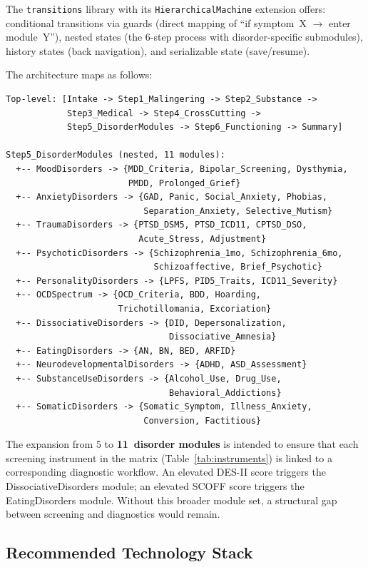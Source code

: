 \documentclass[11pt,a4paper]{article}
\begin{document}
The \texttt{transitions} library with its \texttt{HierarchicalMachine} extension offers: conditional transitions via guards (direct mapping of ``if symptom~X $\to$ enter module~Y''), nested states (the 6-step process with disorder-specific submodules), history states (back navigation), and serializable state (save/resume).

The architecture maps as follows:

\begin{verbatim}
Top-level: [Intake -> Step1_Malingering -> Step2_Substance ->
            Step3_Medical -> Step4_CrossCutting ->
            Step5_DisorderModules -> Step6_Functioning -> Summary]

Step5_DisorderModules (nested, 11 modules):
  +-- MoodDisorders -> {MDD_Criteria, Bipolar_Screening, Dysthymia,
                        PMDD, Prolonged_Grief}
  +-- AnxietyDisorders -> {GAD, Panic, Social_Anxiety, Phobias,
                           Separation_Anxiety, Selective_Mutism}
  +-- TraumaDisorders -> {PTSD_DSM5, PTSD_ICD11, CPTSD_DSO,
                          Acute_Stress, Adjustment}
  +-- PsychoticDisorders -> {Schizophrenia_1mo, Schizophrenia_6mo,
                             Schizoaffective, Brief_Psychotic}
  +-- PersonalityDisorders -> {LPFS, PID5_Traits, ICD11_Severity}
  +-- OCDSpectrum -> {OCD_Criteria, BDD, Hoarding,
                      Trichotillomania, Excoriation}
  +-- DissociativeDisorders -> {DID, Depersonalization,
                                Dissociative_Amnesia}
  +-- EatingDisorders -> {AN, BN, BED, ARFID}
  +-- NeurodevelopmentalDisorders -> {ADHD, ASD_Assessment}
  +-- SubstanceUseDisorders -> {Alcohol_Use, Drug_Use,
                                Behavioral_Addictions}
  +-- SomaticDisorders -> {Somatic_Symptom, Illness_Anxiety,
                           Conversion, Factitious}
\end{verbatim}

The expansion from 5 to \textbf{11~disorder modules} is intended to ensure that each screening instrument in the matrix (Table~\ref{tab:instruments}) is linked to a corresponding diagnostic workflow. An elevated DES-II score triggers the DissociativeDisorders module; an elevated SCOFF score triggers the EatingDisorders module. Without this broader module set, a structural gap between screening and diagnostics would remain.

\subsection{Recommended Technology Stack}
\end{document}
